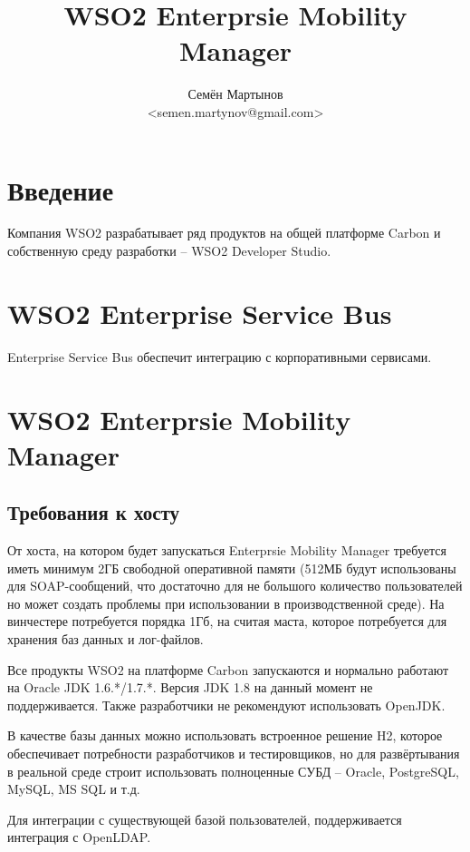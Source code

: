 \documentclass[a4paper, 12pt]{article}		%
\author{Семён Мартынов\\<semen.martynov@gmail.com>}
\title{WSO2 Enterprsie Mobility Manager}
\begin{document}
\maketitle
\tableofcontents{}


\section{Введение}

Компания WSO2 разрабатывает ряд продуктов на общей платформе Carbon и собственную среду разработки -- WSO2 Developer Studio.

\section{WSO2 Enterprise Service Bus}

Enterprise Service Bus обеспечит интеграцию с корпоративными сервисами.

\section{WSO2 Enterprsie Mobility Manager}

\subsection{Требования к хосту}

От хоста, на котором будет запускаться Enterprsie Mobility Manager требуется иметь минимум 2ГБ свободной оперативной памяти (512МБ будут использованы для SOAP-сообщений, что достаточно для не большого количество пользователей но может создать проблемы при использовании в производственной среде). На винчестере потребуется порядка 1Гб, на считая маста, которое потребуется для хранения баз данных и лог-файлов.

Все продукты WSO2 на платформе Carbon запускаются и нормально работают на Oracle JDK 1.6.*/1.7.*. Версия JDK 1.8 на данный момент не поддерживается. Также разработчики не рекомендуют использовать OpenJDK.

В качестве базы данных можно использовать встроенное решение H2, которое обеспечивает потребности разработчиков и тестировщиков, но для развёртывания в реальной среде строит использовать полноценные СУБД -- Oracle, PostgreSQL, MySQL, MS SQL и т.д.

Для интеграции с существующей базой пользователей, поддерживается интеграция с OpenLDAP.
\end{document}
